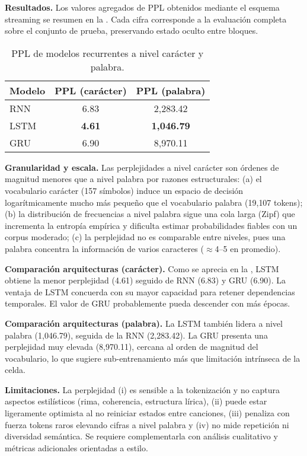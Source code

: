 \documentclass[paper=letter, fontsize=11pt, draft=false]{scrartcl}
\numberwithin{equation}{section} %
\numberwithin{figure}{section} %
\numberwithin{table}{section} %
\numberwithin{subsection}{section}
\begin{document}
\textbf{Resultados.}
Los valores agregados de PPL obtenidos mediante el esquema streaming se resumen en la . Cada cifra corresponde a la evaluación completa sobre el conjunto de prueba, preservando estado oculto entre bloques.

\begin{table}[H]
    \centering
    \begin{tabular}{l|cc}
        \hline
        Modelo & PPL (carácter) & PPL (palabra) \\
        \hline
        RNN  & 6.83 & 2{,}283.42 \\
        LSTM & \textbf{4.61} & \textbf{1{,}046.79} \\
        GRU  & 6.90 & 8{,}970.11 \\
        \hline
    \end{tabular}
    \caption{PPL de modelos recurrentes a nivel carácter y palabra.}
    \label{tab:perplex_rnn}
\end{table}

\textbf{Granularidad y escala.} Las perplejidades a nivel carácter son órdenes de magnitud menores que a nivel palabra por razones estructurales: (a) el vocabulario carácter (157 símbolos) induce un espacio de decisión logarítmicamente mucho más pequeño que el vocabulario palabra (19{,}107 tokens); (b) la distribución de frecuencias a nivel palabra sigue una cola larga (Zipf) que incrementa la entropía empírica y dificulta estimar probabilidades fiables con un corpus moderado; (c) la perplejidad no es comparable entre niveles, pues una palabra concentra la información de varios caracteres ($\approx$4–5 en promedio).

\textbf{Comparación arquitecturas (carácter).} Como se aprecia en la , LSTM obtiene la menor perplejidad (4.61) seguido de RNN (6.83) y GRU (6.90). La ventaja de LSTM concuerda con su mayor capacidad para retener dependencias temporales. El valor de GRU probablemente pueda descender con más épocas.

\textbf{Comparación arquitecturas (palabra).} La LSTM también lidera a nivel palabra (1{,}046.79), seguida de la RNN (2{,}283.42). La GRU presenta una perplejidad muy elevada (8{,}970.11), cercana al orden de magnitud del vocabulario, lo que sugiere sub-entrenamiento más que limitación intrínseca de la celda.


\textbf{Limitaciones.} La perplejidad (i) es sensible a la tokenización y no captura aspectos estilísticos (rima, coherencia, estructura lírica), (ii) puede estar ligeramente optimista al no reiniciar estados entre canciones, (iii) penaliza con fuerza tokens raros elevando cifras a nivel palabra y (iv) no mide repetición ni diversidad semántica. Se requiere complementarla con análisis cualitativo y métricas adicionales orientadas a estilo.
\end{document}

